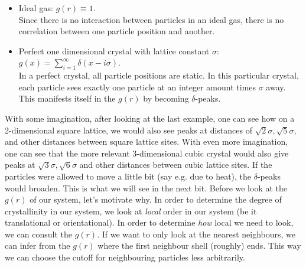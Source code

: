 \documentclass[thesis]{subfiles}
\begin{document}
\begin{itemize}
	\item Ideal gas: $g(r) \equiv 1$.\\
	Since there is no interaction between particles in an ideal gas, there is no correlation between one particle position and another.
\begin{comment}
	\item Dilute gas of hard spheres of diameter $\sigma$: $g(r) = \begin{cases} 0 & \textrm{if } r < \sigma, \\ 1 & \textrm{else.} \end{cases}$\\
	Since hard spheres cannot overlap, we won't find any within one diameter of another (hence the $g(r)$ is zero there). But because the gas is dilute, there is very little interaction, and it'll be equally likely to find a sphere anywhere else.
\end{comment}
	\item Perfect one dimensional crystal with lattice constant $\sigma$: $g(x) = \sum_{i = 1}^\infty \delta(x - i\sigma)$.\\
	In a perfect crystal, all particle positions are static. In this particular crystal, each particle sees exactly one particle at an integer amount times $\sigma$ away. This manifests itself in the $g(r)$ by becoming $\delta$-peaks.
\end{itemize}

With some imagination, after looking at the last example, one can see how on a 2-dimensional square lattice, we would also see peaks at distances of $\sqrt 2\sigma, \sqrt 5\sigma$, and other distances between square lattice sites. With even more imagination, one can see that the more relevant 3-dimensional cubic crystal would also give peaks at $\sqrt 3 \sigma, \sqrt 6 \sigma$ and other distances between cubic lattice sites.
If the particles were allowed to move a little bit (say e.g. due to heat), the $\delta$-peaks would broaden. This is what we will see in the next bit.
\bigbreak
Before we look at the $g(r)$ of our system, let's motivate why. In order to determine the degree of crystallinity in our system, we look at \emph{local} order in our system (be it translational or orientational). In order to determine \emph{how} local we need to look, we can consult the $g(r)$. If we want to only look at the nearest neighbours, we can infer from the $g(r)$ where the first neighbour shell (roughly) ends. This way we can choose the cutoff for neighbouring particles less arbitrarily.
\end{document}
